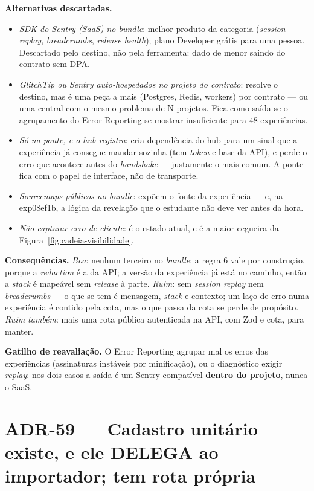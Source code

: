 \textbf{Alternativas descartadas.}
\begin{itemize}
  \item \emph{SDK do Sentry (SaaS) no \emph{bundle}}: melhor produto da
    categoria (\emph{session replay}, \emph{breadcrumbs}, \emph{release
    health}); plano Developer grátis para uma pessoa. Descartado pelo
    destino, não pela ferramenta: dado de menor saindo do contrato sem DPA.
  \item \emph{GlitchTip ou Sentry auto-hospedados no projeto do contrato}:
    resolve o destino, mas é uma peça a mais (Postgres, Redis, workers) por
    contrato --- ou uma central com o mesmo problema de N projetos. Fica
    como saída se o agrupamento do Error Reporting se mostrar insuficiente
    para 48 experiências.
  \item \emph{Só  na ponte, e o hub registra}: cria dependência
    do hub para um sinal que a experiência já consegue mandar sozinha (tem
    \emph{token} e base da API), e perde o erro que acontece antes do
    \emph{handshake} --- justamente o mais comum. A ponte fica com o papel de
    interface, não de transporte.
  \item \emph{\emph{Sourcemaps} públicos no \emph{bundle}}: expõem o fonte
    da experiência --- e, na exp08ef1b, a lógica da revelação que o estudante
    não deve ver antes da hora.
  \item \emph{Não capturar erro de cliente}: é o estado atual, e é a maior
    cegueira da Figura~\ref{fig:cadeia-visibilidade}.
\end{itemize}

\textbf{Consequências.} \emph{Boa}: nenhum terceiro no \emph{bundle}; a regra
6 vale por construção, porque a \emph{redaction} é a da API; a versão da
experiência já está no caminho, então a \emph{stack} é mapeável sem
\emph{release} à parte. \emph{Ruim}: sem \emph{session replay} nem
\emph{breadcrumbs} --- o que se tem é mensagem, \emph{stack} e contexto; um
laço de erro numa experiência é contido pela cota, mas o que passa da cota se
perde de propósito. \emph{Ruim também}: mais uma rota pública autenticada na
API, com Zod e cota, para manter.

\textbf{Gatilho de reavaliação.} O Error Reporting agrupar mal os erros das
experiências (assinaturas instáveis por minificação), ou o diagnóstico exigir
\emph{replay}: nos dois casos a saída é um Sentry-compatível
\textbf{dentro do projeto}, nunca o SaaS.

\section{ADR-59 --- Cadastro unitário existe, e ele DELEGA ao importador;
 tem rota própria}
\label{adr:cadastro-unitario-delega}

